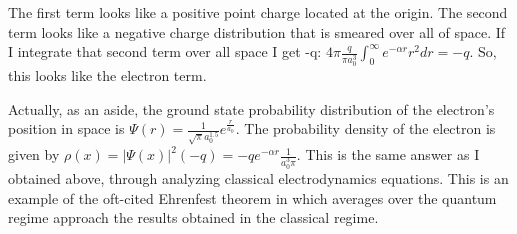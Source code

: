 \begin{homeworkProblem}
The first term looks like a positive point charge located at the origin. The second term looks like a negative charge distribution that is smeared over all of space. If I integrate that second term over all space I get -q: $4\pi \frac{q}{\pi a_0^3} \int_0^{\infty} e^{-\alpha r} r^2 dr = -q$. So, this looks like the electron term.
\\ 
\par
Actually, as an aside, the ground state probability distribution of the electron's position in space is $\Psi(r) = \frac{1}{\sqrt{\pi} a_0^{1.5}}e^{\frac{r}{a_0}}$. The probability density of the electron is given by $\rho(x) = |\Psi(x)|^2 (-q) = -q e^{-\alpha r} \frac{1}{a_0^3 \pi}$. This is the same answer as I obtained above, through analyzing classical electrodynamics equations. This is an example of the oft-cited Ehrenfest theorem in which averages over the quantum regime approach the results obtained in the classical regime.

\end{homeworkProblem}